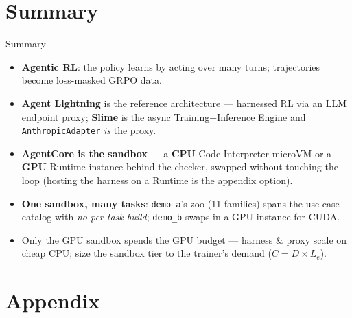 \documentclass[aspectratio=169]{beamer}
\begin{document}
\section*{Summary}

\begin{frame}{Summary}
  \begin{itemize}\setlength\itemsep{0.5em}
    \item \textbf{Agentic RL}: the policy learns by acting over many turns; trajectories become
      loss-masked GRPO data.
    \item \textbf{Agent Lightning} is the reference architecture --- harnessed RL via an LLM endpoint
      proxy; \textbf{Slime} is the async Training+Inference Engine and \texttt{AnthropicAdapter} \emph{is} the proxy.
    \item \textbf{AgentCore is the sandbox} --- a \textbf{CPU} Code-Interpreter microVM or a \textbf{GPU}
      Runtime instance behind the checker, swapped without touching the loop (hosting the harness on a Runtime is the appendix option).
    \item \textbf{One sandbox, many tasks}: \texttt{demo\_a}'s zoo (11 families) spans the use-case catalog
      with \emph{no per-task build}; \texttt{demo\_b} swaps in a GPU instance for CUDA.
    \item Only the GPU sandbox spends the GPU budget --- harness \& proxy scale on cheap CPU; size the
      sandbox tier to the trainer's demand ($C = D \times L_e$).
  \end{itemize}
\end{frame}

\appendix
\section{Appendix}
\end{document}
